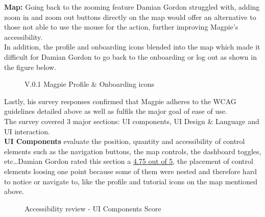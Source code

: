 \newpage
\noindent\textbf{Map: }
Going back to the zooming feature Damian Gordon struggled with, adding zoom in and zoom out buttons directly on the map would offer an alternative to those not able to use the mouse for the action, further improving Magpie's accessibility.\\In addition, the profile and onboarding icons blended into the map which made it difficult for Damian Gordon to go back to the onboarding or log out as shown in the figure below.
\begin{figure}
    \centering
    \caption{V.0.1 Magpie Profile \& Onboarding icons}
\end{figure}

\newpage
\noindent Lastly, his survey responses confirmed that Magpie adheres to the WCAG guidelines detailed above as well as fulfils the major goal of ease of use.\\
The survey covered 3 major sections: UI components, UI Design \& Language and UI interaction.\\
\textbf{UI Components} evaluate the position, quantity and accessibility of control elements such as the navigation buttons, the map controls, the dashboard toggles, etc\ldots Damian Gordon rated this section a \underline{4.75 out of 5}, the placement of control elements loosing one point because some of them were nested and therefore hard to notice or navigate to, like the profile and tutorial icons on the map mentioned above.
\begin{figure}
    \centering
    \caption{Accessibility review - UI Components Score}
\end{figure}


